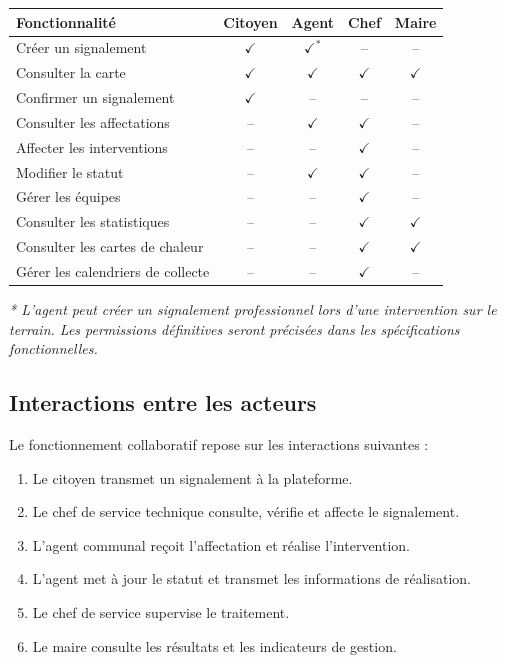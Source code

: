 \documentclass[11pt,a4paper,oneside]{report}
\begin{document}
	\begin{table}[h!]
		\centering
		\scriptsize
		\renewcommand{\arraystretch}{1.2}
		\begin{tabular}{|p{5.4cm}|c|c|c|c|}
			\hline
			\textbf{Fonctionnalité} &
			\textbf{Citoyen} &
			\textbf{Agent} &
			\textbf{Chef} &
			\textbf{Maire} \\ \hline
			
			Créer un signalement & $\checkmark$ & $\checkmark^*$ & -- & -- \\ \hline
			Consulter la carte & $\checkmark$ & $\checkmark$ & $\checkmark$ & $\checkmark$ \\ \hline
			Confirmer un signalement & $\checkmark$ & -- & -- & -- \\ \hline
			Consulter les affectations & -- & $\checkmark$ & $\checkmark$ & -- \\ \hline
			Affecter les interventions & -- & -- & $\checkmark$ & -- \\ \hline
			Modifier le statut & -- & $\checkmark$ & $\checkmark$ & -- \\ \hline
			Gérer les équipes & -- & -- & $\checkmark$ & -- \\ \hline
			Consulter les statistiques & -- & -- & $\checkmark$ & $\checkmark$ \\ \hline
			Consulter les cartes de chaleur & -- & -- & $\checkmark$ & $\checkmark$ \\ \hline
			Gérer les calendriers de collecte & -- & -- & $\checkmark$ & -- \\ \hline
		\end{tabular}
	\end{table}
	
	\noindent
	\textit{* L'agent peut créer un signalement professionnel
		lors d'une intervention sur le terrain. Les permissions
		définitives seront précisées dans les spécifications
		fonctionnelles.}
	
	\subsection{Interactions entre les acteurs}
	
	Le fonctionnement collaboratif repose sur les
	interactions suivantes :
	
	\begin{enumerate}
		\item Le citoyen transmet un signalement à la plateforme.
		\item Le chef de service technique consulte, vérifie
		et affecte le signalement.
		\item L'agent communal reçoit l'affectation et réalise
		l'intervention.
		\item L'agent met à jour le statut et transmet les
		informations de réalisation.
		\item Le chef de service supervise le traitement.
		\item Le maire consulte les résultats et les indicateurs
		de gestion.
	\end{enumerate}
	
\end{document}
